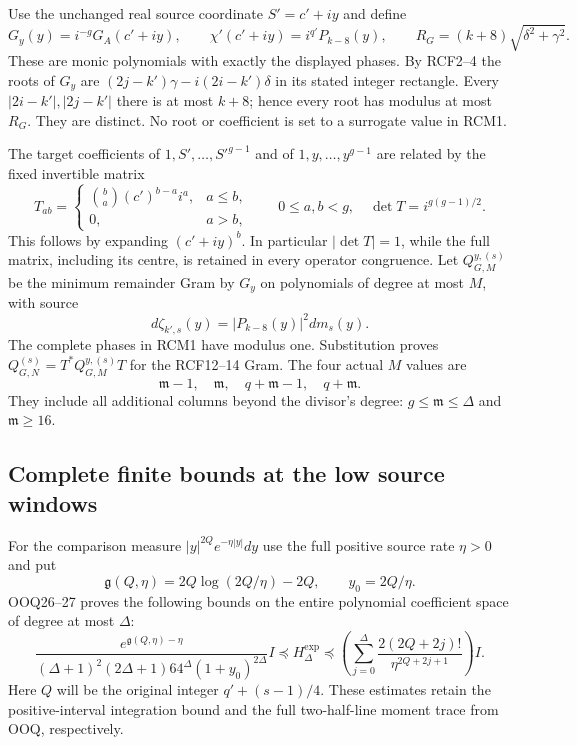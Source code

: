 \documentclass[11pt,a4paper]{article}
\begin{document}
Use the unchanged real source coordinate $S'=c'+iy$ and define
\[
 G_y(y)=i^{-g}G_A(c'+iy),\qquad
 \chi'(c'+iy)=i^{q'}P_{k-8}(y),\qquad
 R_G=(k+8)\sqrt{\delta^2+\gamma^2}.
 \tag{RCM1}
\]
These are monic polynomials with exactly the displayed phases.
By RCF2--4 the roots of $G_y$ are
$(2j-k')\gamma-i(2i-k')\delta$ in its stated integer rectangle.
Every $|2i-k'|,|2j-k'|$ there is at most $k+8$; hence every
root has modulus at most $R_G$. They are distinct. No root or
coefficient is set to a surrogate value in RCM1.

The target coefficients of $1,S',\ldots,S'^{g-1}$ and of
$1,y,\ldots,y^{g-1}$ are related by the fixed invertible matrix
\[
 T_{a b}=\begin{cases}\binom ba(c')^{b-a}i^a,&a\le b,\\0,&a>b,
              \end{cases}\qquad 0\le a,b<g,
 \quad \det T=i^{g(g-1)/2}.
 \tag{RCM2}
\]
This follows by expanding $(c'+iy)^b$. In particular $|\det T|=1$,
while the full matrix, including its centre, is retained in every
operator congruence. Let $Q_{G,M}^{y,(s)}$ be the minimum remainder
Gram by $G_y$ on polynomials of degree at most $M$, with source
\[
 d\zeta_{k',s}(y)=|P_{k-8}(y)|^2dm_s(y).
 \tag{RCM3}
\]
The complete phases in RCM1 have modulus one. Substitution proves
$Q_{G,N}^{(s)}=T^*Q_{G,M}^{y,(s)}T$ for the RCF12--14 Gram.
The four actual $M$ values are
\[
 \mathfrak m-1,\quad\mathfrak m,\quad
 q+\mathfrak m-1,\quad q+\mathfrak m.
 \tag{RCM4}
\]
They include all additional columns beyond the divisor's degree:
$g\le\mathfrak m\le\Delta$ and $\mathfrak m\ge16$.

\subsection{Complete finite bounds at the low source windows}

For the comparison measure $|y|^{2Q}e^{-\eta|y|}dy$ use the
full positive source rate $\eta>0$ and put
\[
 \mathfrak g(Q,\eta)=2Q\log(2Q/\eta)-2Q,\qquad y_0=2Q/\eta.
 \tag{RCM5}
\]
OOQ26--27 proves the following bounds on the entire polynomial
coefficient space of degree at most $\Delta$:
\[
 \frac{e^{\mathfrak g(Q,\eta)-\eta}}
 { (\Delta+1)^2(2\Delta+1)64^\Delta(1+y_0)^{2\Delta}}I
 \preceq H_{\Delta}^{\exp}
 \preceq
 \left(\sum_{j=0}^{\Delta}\frac{2(2Q+2j)!}{\eta^{2Q+2j+1}}\right)I.
 \tag{RCM6}
\]
Here $Q$ will be the original integer $q'+(s-1)/4$. These
estimates retain the positive-interval integration bound and the
full two-half-line moment trace from OOQ, respectively.
\end{document}
